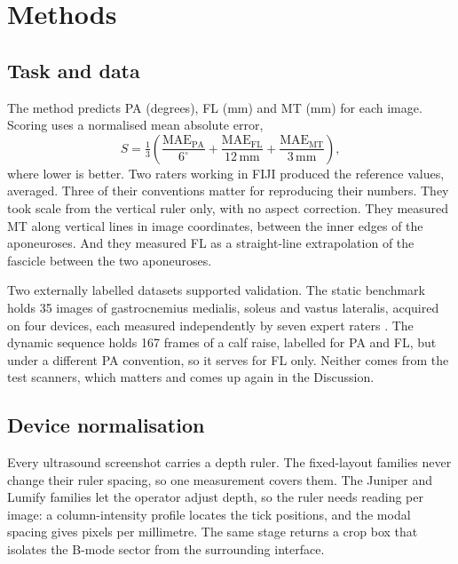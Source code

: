 \documentclass[12pt]{article}
\begin{document}
\section{Methods}

\subsection{Task and data}

The method predicts PA (degrees), FL (mm) and MT (mm) for each image. Scoring
uses a normalised mean absolute error,
\begin{equation}
S = \tfrac{1}{3}\left(
\frac{\mathrm{MAE}_{\mathrm{PA}}}{6^{\circ}} +
\frac{\mathrm{MAE}_{\mathrm{FL}}}{12\,\mathrm{mm}} +
\frac{\mathrm{MAE}_{\mathrm{MT}}}{3\,\mathrm{mm}} \right),
\end{equation}
where lower is better. Two raters working in FIJI produced the reference values,
averaged. Three of their conventions matter for reproducing their numbers. They
took scale from the vertical ruler only, with no aspect correction. They
measured MT along vertical lines in image coordinates, between the inner edges
of the aponeuroses. And they measured FL as a straight-line extrapolation of the
fascicle between the two aponeuroses.

Two externally labelled datasets supported validation. The static benchmark
holds 35 images of gastrocnemius medialis, soleus and vastus lateralis, acquired
on four devices, each measured independently by seven expert raters
\citep{umud2024}. The dynamic sequence holds 167 frames of a calf raise,
labelled for PA and FL, but under a different PA convention, so it serves for FL
only. Neither comes from the test scanners, which matters and comes up again in
the Discussion.

\subsection{Device normalisation}

Every ultrasound screenshot carries a depth ruler. The fixed-layout families
never change their ruler spacing, so one measurement covers them. The Juniper
and Lumify families let the operator adjust depth, so the ruler needs reading
per image: a column-intensity profile locates the tick positions, and the modal
spacing gives pixels per millimetre. The same stage returns a crop box that
isolates the B-mode sector from the surrounding interface.
\end{document}
